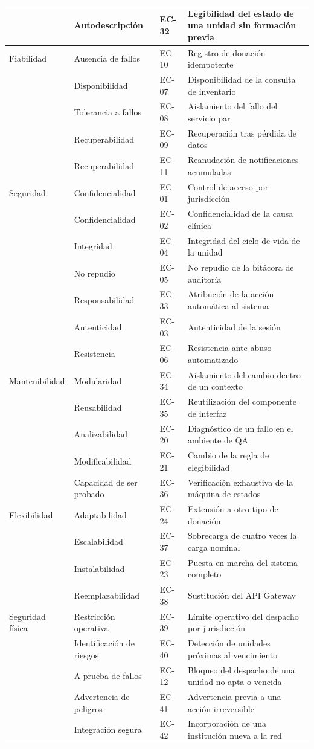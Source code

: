 \documentclass[11pt,a4paper]{article}
\begin{document}
\begin{longtable}{L{3.4cm} L{4.4cm} L{2.0cm} L{4.4cm}}
 & Autodescripción & EC-32 & Legibilidad del estado de una unidad sin formación previa \\
\midrule
Fiabilidad & Ausencia de fallos & EC-10 & Registro de donación idempotente \\
 & Disponibilidad & EC-07 & Disponibilidad de la consulta de inventario \\
 & Tolerancia a fallos & EC-08 & Aislamiento del fallo del servicio par \\
 & Recuperabilidad & EC-09 & Recuperación tras pérdida de datos \\
 & Recuperabilidad & EC-11 & Reanudación de notificaciones acumuladas \\
\midrule
Seguridad & Confidencialidad & EC-01 & Control de acceso por jurisdicción \\
 & Confidencialidad & EC-02 & Confidencialidad de la causa clínica \\
 & Integridad & EC-04 & Integridad del ciclo de vida de la unidad \\
 & No repudio & EC-05 & No repudio de la bitácora de auditoría \\
 & Responsabilidad & EC-33 & Atribución de la acción automática al sistema \\
 & Autenticidad & EC-03 & Autenticidad de la sesión \\
 & Resistencia & EC-06 & Resistencia ante abuso automatizado \\
\midrule
Mantenibilidad & Modularidad & EC-34 & Aislamiento del cambio dentro de un contexto \\
 & Reusabilidad & EC-35 & Reutilización del componente de interfaz \\
 & Analizabilidad & EC-20 & Diagnóstico de un fallo en el ambiente de QA \\
 & Modificabilidad & EC-21 & Cambio de la regla de elegibilidad \\
 & Capacidad de ser probado & EC-36 & Verificación exhaustiva de la máquina de estados \\
\midrule
Flexibilidad & Adaptabilidad & EC-24 & Extensión a otro tipo de donación \\
 & Escalabilidad & EC-37 & Sobrecarga de cuatro veces la carga nominal \\
 & Instalabilidad & EC-23 & Puesta en marcha del sistema completo \\
 & Reemplazabilidad & EC-38 & Sustitución del API Gateway \\
\midrule
Seguridad física & Restricción operativa & EC-39 & Límite operativo del despacho por jurisdicción \\
 & Identificación de riesgos & EC-40 & Detección de unidades próximas al vencimiento \\
 & A prueba de fallos & EC-12 & Bloqueo del despacho de una unidad no apta o vencida \\
 & Advertencia de peligros & EC-41 & Advertencia previa a una acción irreversible \\
 & Integración segura & EC-42 & Incorporación de una institución nueva a la red \\
\end{longtable}
\end{document}
